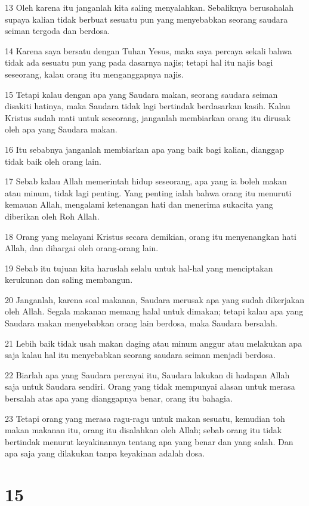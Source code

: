 \par 13 Oleh karena itu janganlah kita saling menyalahkan. Sebaliknya berusahalah supaya kalian tidak berbuat sesuatu pun yang menyebabkan seorang saudara seiman tergoda dan berdosa.
\par 14 Karena saya bersatu dengan Tuhan Yesus, maka saya percaya sekali bahwa tidak ada sesuatu pun yang pada dasarnya najis; tetapi hal itu najis bagi seseorang, kalau orang itu menganggapnya najis.
\par 15 Tetapi kalau dengan apa yang Saudara makan, seorang saudara seiman disakiti hatinya, maka Saudara tidak lagi bertindak berdasarkan kasih. Kalau Kristus sudah mati untuk seseorang, janganlah membiarkan orang itu dirusak oleh apa yang Saudara makan.
\par 16 Itu sebabnya janganlah membiarkan apa yang baik bagi kalian, dianggap tidak baik oleh orang lain.
\par 17 Sebab kalau Allah memerintah hidup seseorang, apa yang ia boleh makan atau minum, tidak lagi penting. Yang penting ialah bahwa orang itu menuruti kemauan Allah, mengalami ketenangan hati dan menerima sukacita yang diberikan oleh Roh Allah.
\par 18 Orang yang melayani Kristus secara demikian, orang itu menyenangkan hati Allah, dan dihargai oleh orang-orang lain.
\par 19 Sebab itu tujuan kita haruslah selalu untuk hal-hal yang menciptakan kerukunan dan saling membangun.
\par 20 Janganlah, karena soal makanan, Saudara merusak apa yang sudah dikerjakan oleh Allah. Segala makanan memang halal untuk dimakan; tetapi kalau apa yang Saudara makan menyebabkan orang lain berdosa, maka Saudara bersalah.
\par 21 Lebih baik tidak usah makan daging atau minum anggur atau melakukan apa saja kalau hal itu menyebabkan seorang saudara seiman menjadi berdosa.
\par 22 Biarlah apa yang Saudara percayai itu, Saudara lakukan di hadapan Allah saja untuk Saudara sendiri. Orang yang tidak mempunyai alasan untuk merasa bersalah atas apa yang dianggapnya benar, orang itu bahagia.
\par 23 Tetapi orang yang merasa ragu-ragu untuk makan sesuatu, kemudian toh makan makanan itu, orang itu disalahkan oleh Allah; sebab orang itu tidak bertindak menurut keyakinannya tentang apa yang benar dan yang salah. Dan apa saja yang dilakukan tanpa keyakinan adalah dosa.

\chapter{15}

